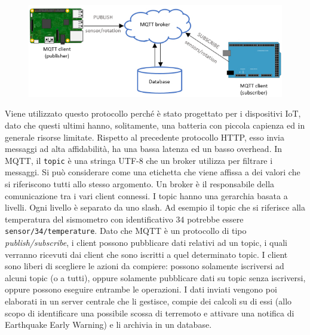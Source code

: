 \documentclass[a4paper,10pt]{memoir}
\begin{document}
\begin{figure}[ht]
\centering
\label{fig:mqtt}
\includegraphics[width=1\textwidth]{Chapter-1/mqtt.jpg}
\end{figure}
Viene utilizzato questo protocollo perché è stato progettato per i dispositivi IoT, dato che questi ultimi hanno, solitamente, una batteria con piccola capienza ed in generale risorse limitate. Rispetto al precedente protocollo HTTP, esso invia messaggi ad alta affidabilità, ha una bassa latenza ed un basso overhead\cite{ottimizzazione}. In MQTT, il \texttt{topic} è una stringa UTF-8 che un broker utilizza per filtrare i messaggi. 
Si può considerare come una etichetta che viene affissa a dei valori che si riferiscono tutti allo stesso argomento. Un broker è il responsabile della comunicazione tra i vari client connessi. I topic hanno una gerarchia basata a livelli. Ogni livello è separato da uno slash. 
Ad esempio il topic che si riferisce alla temperatura del sismometro con identificativo $34$ potrebbe essere \texttt{sensor/34/temperature}.
Dato che MQTT è un protocollo di tipo \textit{publish/subscribe}, i client possono pubblicare dati relativi ad un topic, i quali verranno ricevuti dai client che sono iscritti a quel determinato topic.
I client sono liberi di scegliere le azioni da compiere: possono solamente iscriversi ad alcuni topic (o a tutti), oppure solamente pubblicare dati su topic senza iscriversi, oppure possono eseguire entrambe le operazioni.
I dati inviati vengono poi elaborati in un server centrale che li gestisce, compie dei calcoli su di essi (allo scopo di identificare una possibile scossa di terremoto e attivare una notifica di Earthquake Early Warning) e li archivia in un database. 

\clearpage
\end{document}

